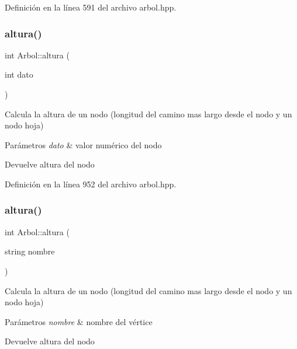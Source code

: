 Definición en la línea 591 del archivo arbol.\+hpp.

\mbox{\label{classArbol_a98151655f0dab81b40d34f87fbbd90cd}} 
\subsubsection{\texorpdfstring{altura()}{altura()}\hspace{0.1cm}{\footnotesize\ttfamily [1/3]}}
{\footnotesize\ttfamily int Arbol\+::altura (\begin{DoxyParamCaption}\item[{int}]{dato }\end{DoxyParamCaption})}



Calcula la altura de un nodo (longitud del camino mas largo desde el nodo y un nodo hoja) 


\begin{DoxyParams}{Parámetros}
{\em dato} & valor numérico del nodo \\
\hline
\end{DoxyParams}
\begin{DoxyReturn}{Devuelve}
altura del nodo 
\end{DoxyReturn}


Definición en la línea 952 del archivo arbol.\+hpp.

\mbox{\label{classArbol_a7a79cb43ca30b5120f1a8ebe3afbe22c}} 
\subsubsection{\texorpdfstring{altura()}{altura()}\hspace{0.1cm}{\footnotesize\ttfamily [2/3]}}
{\footnotesize\ttfamily int Arbol\+::altura (\begin{DoxyParamCaption}\item[{string}]{nombre }\end{DoxyParamCaption})}



Calcula la altura de un nodo (longitud del camino mas largo desde el nodo y un nodo hoja) 


\begin{DoxyParams}{Parámetros}
{\em nombre} & nombre del vértice \\
\hline
\end{DoxyParams}
\begin{DoxyReturn}{Devuelve}
altura del nodo 
\end{DoxyReturn}


